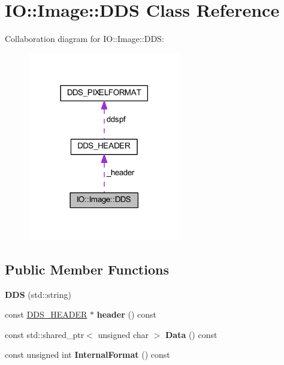 \hypertarget{class_i_o_1_1_image_1_1_d_d_s}{}\section{IO\+:\+:Image\+:\+:D\+DS Class Reference}
\label{class_i_o_1_1_image_1_1_d_d_s}


Collaboration diagram for IO\+:\+:Image\+:\+:D\+DS\+:
\nopagebreak
\begin{figure}[H]
\begin{center}
\leavevmode
\includegraphics[width=189pt]{class_i_o_1_1_image_1_1_d_d_s__coll__graph}
\end{center}
\end{figure}
\subsection*{Public Member Functions}
\begin{DoxyCompactItemize}
\item 
{\bfseries D\+DS} (std\+::string)\hypertarget{class_i_o_1_1_image_1_1_d_d_s_ac5ac976521bebdef668de3e1cf77e279}{}\label{class_i_o_1_1_image_1_1_d_d_s_ac5ac976521bebdef668de3e1cf77e279}

\item 
const \hyperlink{struct_d_d_s___h_e_a_d_e_r}{D\+D\+S\+\_\+\+H\+E\+A\+D\+ER} $\ast$ {\bfseries header} () const \hypertarget{class_i_o_1_1_image_1_1_d_d_s_a6a15230421bf4b07a38029dae364808f}{}\label{class_i_o_1_1_image_1_1_d_d_s_a6a15230421bf4b07a38029dae364808f}

\item 
const std\+::shared\+\_\+ptr$<$ unsigned char $>$ {\bfseries Data} () const \hypertarget{class_i_o_1_1_image_1_1_d_d_s_ac4f120e5afbb940faffabbf7c705fdd7}{}\label{class_i_o_1_1_image_1_1_d_d_s_ac4f120e5afbb940faffabbf7c705fdd7}

\item 
const unsigned int {\bfseries Internal\+Format} () const \hypertarget{class_i_o_1_1_image_1_1_d_d_s_a32785a55a7a1267ff0c3bde1dfb8eb6f}{}\label{class_i_o_1_1_image_1_1_d_d_s_a32785a55a7a1267ff0c3bde1dfb8eb6f}

\end{DoxyCompactItemize}
